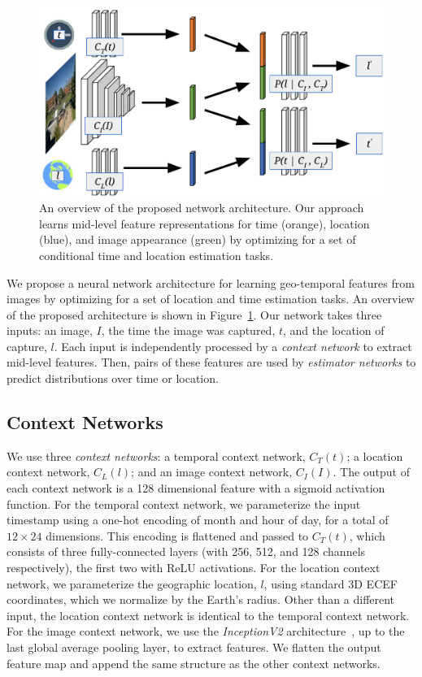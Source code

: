 \documentclass{bmvc2k}
\newcommand{\figlab}[1]{\label{fig:#1}}
\newcommand{\figref}[1]{Figure~\ref{fig:#1}}
\begin{document}
\begin{figure}[t]
  \centering

  \includegraphics[width=.7\linewidth]{architecture.pdf} \caption{An
  overview of the proposed network architecture. Our approach learns mid-level
  feature representations for time (orange), location (blue), and
  image appearance (green) by optimizing for a set of conditional time
  and location estimation tasks.}
  
  \figlab{architecture}
\end{figure}

We propose a neural network architecture for learning geo-temporal
features from images by optimizing for a set of
location and time estimation tasks. An overview of the proposed
architecture is shown in \figref{architecture}. Our network takes
three inputs: an image, $I$, the time the image was captured, $t$, and
the location of capture, $l$. Each input is independently processed by
a {\em context network} to extract mid-level features. Then, pairs of
these features are used by {\em estimator networks} to predict
distributions over time or location.

\subsection{Context Networks}

We use three {\em context networks}: a temporal context network,
$C_T(t)$; a location context network, $C_L(l)$; and an image context
network, $C_I(I)$. The output of each context network is a 128
dimensional feature with a sigmoid activation function. 
%
For the temporal context network, we parameterize the input timestamp
using a one-hot encoding of month and hour of day, for a total of $12
\times 24$ dimensions.  This encoding is flattened and passed to
$C_T(t)$, which consists of three fully-connected layers (with 256,
512, and 128 channels respectively), the first two with ReLU
activations. 
%
For the location context network, we parameterize the geographic
location, $l$, using standard 3D ECEF coordinates, which we normalize
by the Earth's radius. Other than a different input, the location
context network is identical to the temporal context network. 
%
For the image context network, we use the {\em InceptionV2}
architecture~\cite{szegedy2016rethinking}, up to the last global
average pooling layer, to extract features. We flatten the output
feature map and append the same structure as the other context
networks. 
\end{document}
